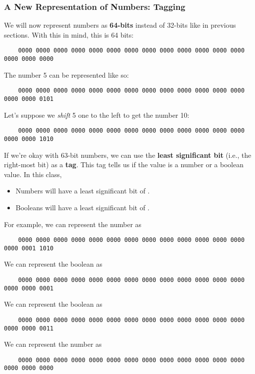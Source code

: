 \documentclass[letterpaper]{article}
\begin{document}
\subsubsection{A New Representation of Numbers: Tagging}
We will now represent numbers as \textbf{64-bits} instead of 32-bits like in previous sections. With this in mind, this is 64 bits:
\begin{verbatim}
    0000 0000 0000 0000 0000 0000 0000 0000 0000 0000 0000 0000 0000 0000 0000 0000\end{verbatim}
The number 5 can be represented like so: 
\begin{verbatim}
    0000 0000 0000 0000 0000 0000 0000 0000 0000 0000 0000 0000 0000 0000 0000 0101\end{verbatim}

Let's suppose we \emph{shift} 5 one to the left to get the number 10: 
\begin{verbatim}
    0000 0000 0000 0000 0000 0000 0000 0000 0000 0000 0000 0000 0000 0000 0000 1010\end{verbatim}

If we're okay with 63-bit numbers, we can use the \textbf{least significant bit} (i.e., the right-most bit) as a \textbf{tag}. This tag tells us if the value is a number or a boolean value. In this class, 
\begin{itemize}
    \item Numbers will have a least significant bit of .
    \item Booleans will have a least significant bit of . 
\end{itemize}
For example, we can represent the number  as 
\begin{verbatim}
    0000 0000 0000 0000 0000 0000 0000 0000 0000 0000 0000 0000 0000 0000 0001 1010\end{verbatim}
We can represent the boolean  as 
\begin{verbatim}
    0000 0000 0000 0000 0000 0000 0000 0000 0000 0000 0000 0000 0000 0000 0000 0001\end{verbatim}
We can represent the boolean  as 
\begin{verbatim}
    0000 0000 0000 0000 0000 0000 0000 0000 0000 0000 0000 0000 0000 0000 0000 0011\end{verbatim}
We can represent the number  as 
\begin{verbatim}
    0000 0000 0000 0000 0000 0000 0000 0000 0000 0000 0000 0000 0000 0000 0000 0000\end{verbatim}
    
\end{document}
